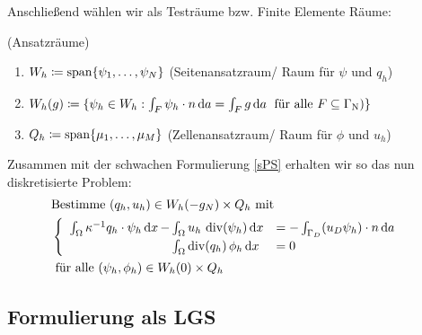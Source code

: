 Anschließend wählen wir als Testräume bzw. Finite Elemente Räume:
\begin{Definition}(Ansatzräume)
	\begin{enumerate}[label=(\alph*)]
		\item $ W_h \coloneqq \operatorname{span} \{ \psi_1,\dots,\psi_{N}\}$ (Seitenansatzraum/ Raum für $ \psi $ und $ q_h $)
		\item $ W_h(g) \coloneqq \{ \psi_h \in W_h:  \int_F \psi_h \cdot n \, \mathrm{d} a = \int_F g \, \mathrm{d} a \; \text{ für alle } F \subseteq \Gamma_{\text{N}})  \}$
		\item $ Q_h \coloneqq \operatorname{span} \{ \mu_1, \dots, \mu_{M} \} $ (Zellenansatzraum/ Raum für $\phi $ und $ u_h $)
	\end{enumerate}
\end{Definition}

%	

Zusammen mit der schwachen Formulierung \eqref{sPS} erhalten wir so das nun diskretisierte Problem:
\begin{align*}
&\text{Bestimme } (q_h,u_h) \in W_h(-g_N) \times Q_h \text{ mit}\\
&\begin{cases}
\begin{array}{llll}
\int_{\Omega} \kappa^{-1} q_h \cdot \psi_h \, \mathrm{d} x \, - \mkern-15mu &\int_{\Omega} u_h \, \operatorname{div}(\psi_h) \, \mathrm{d} x &= - \int_{\Gamma_D} (u_D \psi_h) \cdot n \, \mathrm{d} a\\
&\int_{\Omega} \operatorname{div}(q_h) \, \phi_h \, \mathrm{d} x &= 0
\end{array}
\end{cases}	\\
&\text{ für alle } (\psi_h, \phi_h) \in W_h(0) \times Q_h
\end{align*} 




\subsection{Formulierung als LGS}

